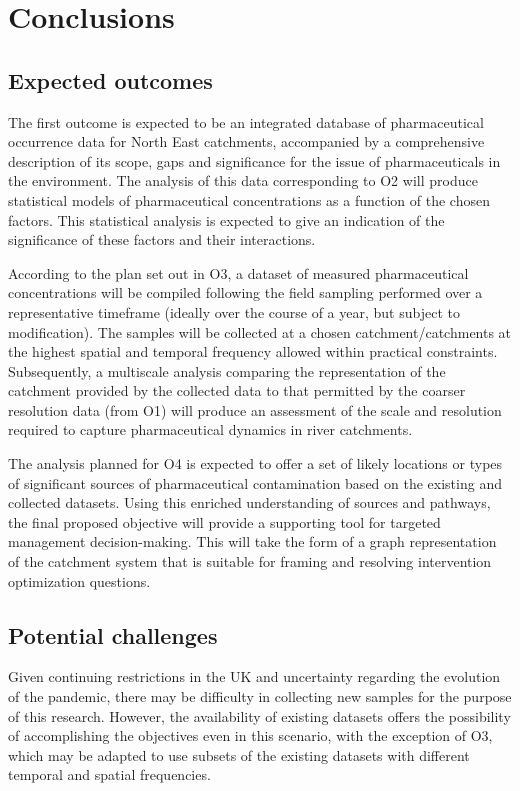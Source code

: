 \documentclass{article}
\begin{document}
\clearpage
\section{Conclusions}

\subsection{Expected outcomes}
The first outcome is expected to be an integrated database of pharmaceutical occurrence data for North East catchments, accompanied by a comprehensive description of its scope, gaps and significance for the issue of pharmaceuticals in the environment. The analysis of this data corresponding to O2 will produce statistical models of pharmaceutical concentrations as a function of the chosen factors. This statistical analysis is expected to give an indication of the significance of these factors and their interactions. 

According to the plan set out in O3, a dataset of measured pharmaceutical concentrations will be compiled following the field sampling performed over a representative timeframe (ideally over the course of a year, but subject to modification). The samples will be collected at a chosen catchment/catchments at the highest spatial and temporal frequency allowed within practical constraints. Subsequently, a multiscale analysis comparing the representation of the catchment provided by the collected data to that permitted by the coarser resolution data (from O1) will produce an assessment of the scale and resolution required to capture pharmaceutical dynamics in river catchments.

The analysis planned for O4 is expected to offer a set of likely locations or types of significant sources of pharmaceutical contamination based on the existing and collected datasets. Using this enriched understanding of sources and pathways, the final proposed objective will provide a supporting tool for targeted management decision-making. This will take the form of a graph representation of the catchment system that is suitable for framing and resolving intervention optimization questions.

\subsection{Potential challenges}
Given continuing restrictions in the UK and uncertainty regarding the evolution of the pandemic, there may be difficulty in collecting new samples for the purpose of this research. However, the availability of existing datasets offers the possibility of accomplishing the objectives even in this scenario, with the exception of O3, which may be adapted to use subsets of the existing datasets with different temporal and spatial frequencies.
\end{document}
